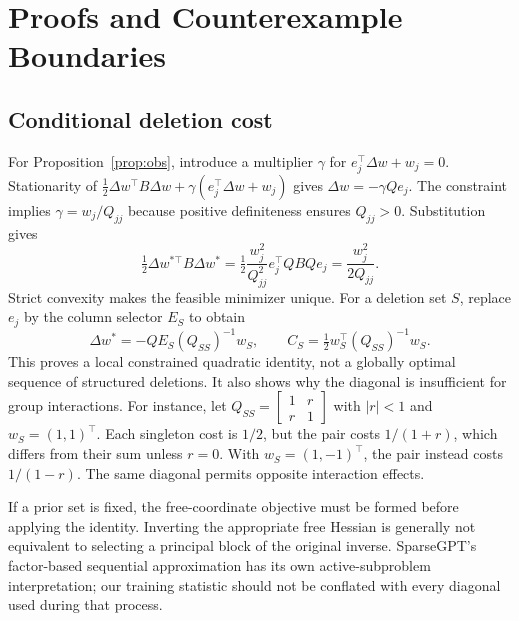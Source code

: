 \section{Proofs and Counterexample Boundaries}
\label{app:proofs}
\subsection{Conditional deletion cost}
For Proposition~\ref{prop:obs}, introduce a multiplier $\gamma$ for $e_j^\top\Delta w+w_j=0$. Stationarity of $\frac12\Delta w^\top B\Delta w+\gamma(e_j^\top\Delta w+w_j)$ gives $\Delta w=-\gamma Qe_j$. The constraint implies $\gamma=w_j/Q_{jj}$ because positive definiteness ensures $Q_{jj}>0$. Substitution gives
\begin{equation}
 \tfrac12\Delta w^{*\top}B\Delta w^*
 =\tfrac12\frac{w_j^2}{Q_{jj}^2}e_j^\top QBQe_j
 =\frac{w_j^2}{2Q_{jj}}.
\end{equation}
Strict convexity makes the feasible minimizer unique. For a deletion set $S$, replace $e_j$ by the column selector $E_S$ to obtain
\begin{equation}
 \Delta w^*=-QE_S(Q_{SS})^{-1}w_S,\qquad
 C_S=\tfrac12w_S^\top(Q_{SS})^{-1}w_S.
\end{equation}
This proves a local constrained quadratic identity, not a globally optimal sequence of structured deletions. It also shows why the diagonal is insufficient for group interactions. For instance, let $Q_{SS}=\left[\begin{smallmatrix}1&r\\r&1\end{smallmatrix}\right]$ with $|r|<1$ and $w_S=(1,1)^\top$. Each singleton cost is $1/2$, but the pair costs $1/(1+r)$, which differs from their sum unless $r=0$. With $w_S=(1,-1)^\top$, the pair instead costs $1/(1-r)$. The same diagonal permits opposite interaction effects.

If a prior set is fixed, the free-coordinate objective must be formed before applying the identity. Inverting the appropriate free Hessian is generally not equivalent to selecting a principal block of the original inverse. SparseGPT's factor-based sequential approximation has its own active-subproblem interpretation; our training statistic should not be conflated with every diagonal used during that process.

